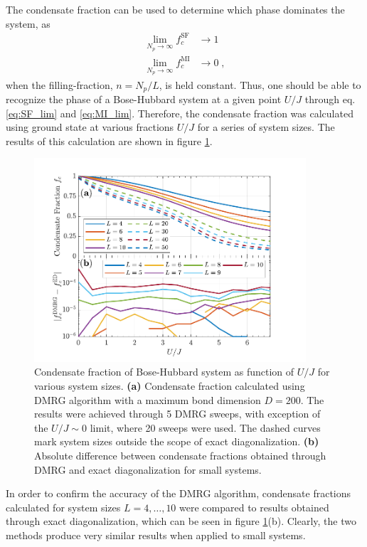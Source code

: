 The condensate fraction can be used to determine which phase dominates the system, as
\begin{align}
	\lim_{N_p \to \infty} f_{c}^{\mathrm{SF}} &\to 1 \label{eq:SF_lim} \\
	\lim_{N_p \to \infty} f_{c}^{\mathrm{MI}} &\to 0 \; , \label{eq:MI_lim}
\end{align}
when the filling-fraction, $n = N_p/L$, is held constant. Thus, one should be able to recognize the phase of a Bose-Hubbard system at a given point $U/J$ through eq. \eqref{eq:SF_lim} and \eqref{eq:MI_lim}.
Therefore, the condensate fraction was calculated using ground state at various fractions $U/J$ for a series of system sizes. The results of this calculation are shown in figure \ref{fig:CondensateFraction}.
\begin{figure}[h!]
    \centering
    \includegraphics[width=0.9\textwidth]{Figures/CondensateFractionCompare.pdf}
 \caption{Condensate fraction of Bose-Hubbard system as function of $U/J$ for various system sizes. \textbf{(a)} Condensate fraction calculated using DMRG algorithm with a maximum bond dimension $D = 200$. The results were achieved through 5 DMRG sweeps, with exception of the $U/J \sim 0$ limit, where 20 sweeps were used. The dashed curves mark system sizes outside the scope of exact diagonalization. \textbf{(b)} Absolute difference between condensate fractions obtained through DMRG and exact diagonalization for small systems.}
 \label{fig:CondensateFraction}
\end{figure}

In order to confirm the accuracy of the DMRG algorithm, condensate fractions calculated for system sizes $L =  4 , \ldots , 10 $ were compared to results obtained through exact diagonalization, which can be seen in figure \ref{fig:CondensateFraction}(b). Clearly, the two methods produce very similar results when applied to small systems.

